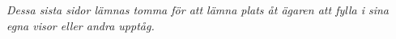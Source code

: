 

\pagestyle{Egna påhitt}



\emph{Dessa sista sidor lämnas tomma för att lämna plats åt ägaren att fylla i sina egna visor eller andra upptåg.}

\newpage
 \phantom{1}
\newpage
 \phantom{1}
\newpage
 \phantom{1}
\newpage
 \phantom{1}
\newpage
 \phantom{1}
\newpage
 \phantom{1}
\newpage
 \phantom{1}
\newpage